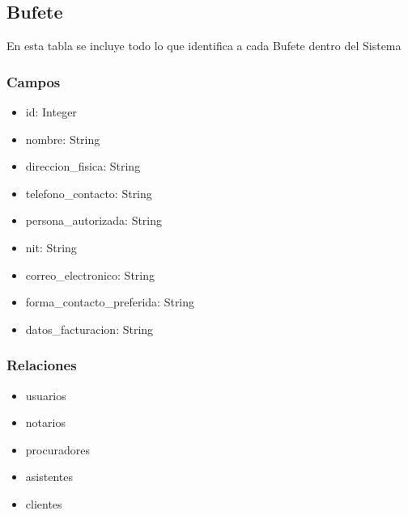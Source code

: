 \documentclass[letterpaper,10pt,spanish]{sphinxmanual}
\begin{document}
\subsection{Bufete}
\label{\detokenize{modelos/bufete:bufete}}\label{\detokenize{modelos/bufete::doc}}
\sphinxAtStartPar
En esta tabla se incluye todo lo que identifica a cada Bufete dentro del Sistema


\subsubsection{Campos}
\label{\detokenize{modelos/bufete:campos}}\begin{itemize}
\item {} 
\sphinxAtStartPar
id: Integer

\item {} 
\sphinxAtStartPar
nombre: String

\item {} 
\sphinxAtStartPar
direccion\_fisica: String

\item {} 
\sphinxAtStartPar
telefono\_contacto: String

\item {} 
\sphinxAtStartPar
persona\_autorizada: String

\item {} 
\sphinxAtStartPar
nit: String

\item {} 
\sphinxAtStartPar
correo\_electronico: String

\item {} 
\sphinxAtStartPar
forma\_contacto\_preferida: String

\item {} 
\sphinxAtStartPar
datos\_facturacion: String

\end{itemize}


\subsubsection{Relaciones}
\label{\detokenize{modelos/bufete:relaciones}}\begin{itemize}
\item {} 
\sphinxAtStartPar
usuarios

\item {} 
\sphinxAtStartPar
notarios

\item {} 
\sphinxAtStartPar
procuradores

\item {} 
\sphinxAtStartPar
asistentes

\item {} 
\sphinxAtStartPar
clientes

\end{itemize}
\end{document}
